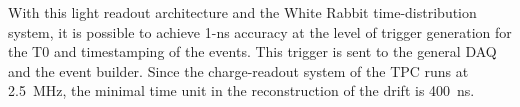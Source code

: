 With this light readout architecture and the White Rabbit time-distribution 
system, it is possible to achieve 1-ns accuracy at the
level of trigger generation for the T0 and timestamping of the
events. This trigger is sent to the general DAQ and the event
builder. Since the charge-readout system of the TPC runs at
2.5~MHz, the minimal time unit in the reconstruction of the drift
is 400~ns.
